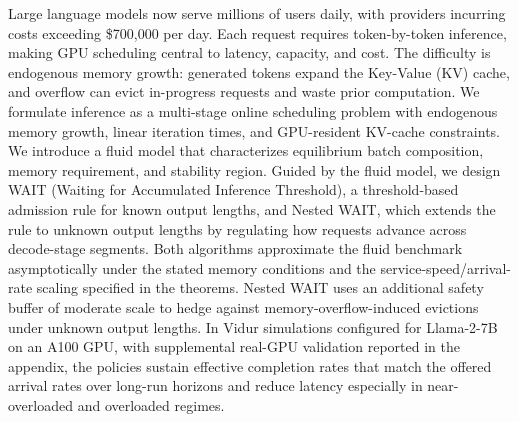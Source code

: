 Large language models now serve millions of users daily, with providers incurring costs exceeding \$700{,}000 per day. Each request requires token-by-token inference, making GPU scheduling central to latency, capacity, and cost. The difficulty is endogenous memory growth: generated tokens expand the Key-Value (KV) cache, and overflow can evict in-progress requests and waste prior computation. We formulate inference as a multi-stage online scheduling problem with endogenous memory growth, linear iteration times, and GPU-resident KV-cache constraints. We introduce a fluid model that characterizes equilibrium batch composition, memory requirement, and stability region. Guided by the fluid model, we design WAIT (Waiting for Accumulated Inference Threshold), a threshold-based admission rule for known output lengths, and Nested WAIT, which extends the rule to unknown output lengths by regulating how requests advance across decode-stage segments. Both algorithms approximate the fluid benchmark asymptotically under the stated memory conditions and the service-speed/arrival-rate scaling specified in the theorems. Nested WAIT uses an additional safety buffer of moderate scale to hedge against memory-overflow-induced evictions under unknown output lengths. In Vidur simulations configured for Llama-2-7B on an A100 GPU, with supplemental real-GPU validation reported in the appendix, the policies sustain effective completion rates that match the offered arrival rates over long-run horizons and reduce latency especially in near-overloaded and overloaded regimes.
